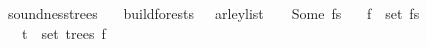 \begin{isabellebody}
\isadelimproof
%
\endisadelimproof
%
\isatagproof
%
\endisatagproof
{\isafoldproof}%
%
\isadelimproof
%
\endisadelimproof
%
\begin{isamarkuptext}%
%
\end{isamarkuptext}\isamarkuptrue%
\isamarkupfalse%
\ soundness{\isacharunderscore}{\kern0pt}trees{\isacharcolon}{\kern0pt}\isanewline
\ \ \ {\isachardoublequoteopen}build{\isacharunderscore}{\kern0pt}forests\ {\isasymG}\ {\isasymomega}\ {\isacharparenleft}{\kern0pt}{\isasymE}arley{\isacharunderscore}{\kern0pt}list\ {\isasymG}\ {\isasymomega}{\isacharparenright}{\kern0pt}\ {\isacharequal}{\kern0pt}\ Some\ fs{\isachardoublequoteclose}\isanewline
\ \ \ {\isachardoublequoteopen}f\ {\isasymin}\ set\ fs{\isachardoublequoteclose}\isanewline
\ \ \ {\isachardoublequoteopen}t\ {\isasymin}\ set\ {\isacharparenleft}{\kern0pt}trees\ f{\isacharparenright}{\kern0pt}{\isachardoublequoteclose}\isanewline
\ \ \ {\isachardoublequoteopen}{\isasymG}\ {\isasymturnstile}\ {\isacharbrackleft}{\kern0pt}{\isasymSS}\ {\isasymG}{\isacharbrackright}{\kern0pt}\ {\isasymRightarrow}\isactrlsup {\isacharasterisk}{\kern0pt}\ {\isasymomega}{\isachardoublequoteclose}%
\isadelimproof
%
\endisadelimproof
%
\isatagproof
%
\endisatagproof
{\isafoldproof}%
%
\isadelimproof
%
\endisadelimproof
%
\isadelimtheory
%
\endisadelimtheory
%
\isatagtheory
%
\endisatagtheory
{\isafoldtheory}%
%
\isadelimtheory
%
\endisadelimtheory
%
\end{isabellebody}%
\endinput
